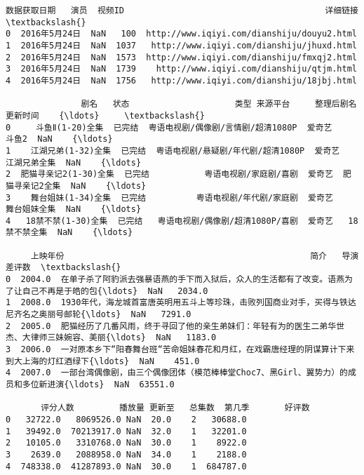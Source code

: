 \documentclass[11pt]{article}
\begin{document}
    \begin{Verbatim}[commandchars=\\\{\}]
       数据获取日期   演员  视频ID                                        详细链接  \textbackslash{}
0  2016年5月24日  NaN   100  http://www.iqiyi.com/dianshiju/douyu2.html   
1  2016年5月24日  NaN  1037   http://www.iqiyi.com/dianshiju/jhuxd.html   
2  2016年5月24日  NaN  1573  http://www.iqiyi.com/dianshiju/fmxqj2.html   
3  2016年5月24日  NaN  1739    http://www.iqiyi.com/dianshiju/qtjm.html   
4  2016年5月24日  NaN  1756   http://www.iqiyi.com/dianshiju/18jbj.html   

               剧名   状态                     类型 来源平台     整理后剧名 更新时间    {\ldots}     \textbackslash{}
0     斗鱼Ⅱ(1-20)全集  已完结  粤语电视剧/偶像剧/言情剧/超清1080P  爱奇艺       斗鱼2  NaN    {\ldots}      
1    江湖兄弟(1-32)全集  已完结  粤语电视剧/悬疑剧/年代剧/超清1080P  爱奇艺    江湖兄弟全集  NaN    {\ldots}      
2  肥猫寻亲记2(1-30)全集  已完结           粤语电视剧/家庭剧/喜剧  爱奇艺  肥猫寻亲记2全集  NaN    {\ldots}      
3    舞台姐妹(1-34)全集  已完结          粤语电视剧/年代剧/家庭剧  爱奇艺    舞台姐妹全集  NaN    {\ldots}      
4   18禁不禁(1-30)全集  已完结   粤语电视剧/偶像剧/超清1080P/喜剧  爱奇艺   18禁不禁全集  NaN    {\ldots}      

     上映年份                                                 简介   导演      差评数  \textbackslash{}
0  2004.0  在单子杀了阿豹派去强暴语燕的手下而入狱后，众人的生活都有了改变。语燕为了让自己不再是于皓的包{\ldots}  NaN   2034.0   
1  2008.0  1930年代，海龙城首富唐英明用五斗上等珍珠，击败列国商业对手，买得与铁达尼齐名之奥丽号邮轮{\ldots}  NaN   7291.0   
2  2005.0  肥猫经历了几番风雨，终于寻回了他的亲生弟妹们：年轻有为的医生二弟华世杰、大律师三妹婉容、美丽{\ldots}  NaN   1183.0   
3  2006.0  一对原本乡下“阳春舞台班“苦命姐妹春花和月红，在戏霸唐经理的阴谋算计下来到大上海的灯红酒绿下{\ldots}  NaN    451.0   
4  2007.0  一部台湾偶像剧，由三个偶像团体（模范棒棒堂Choc7、黑Girl、翼势力）的成员和多位新进演{\ldots}  NaN  63551.0   

       评分人数         播放量 更新至   总集数  第几季       好评数  
0   32722.0   8069526.0 NaN  20.0    2   30688.0  
1   39492.0  70213917.0 NaN  32.0    1   32201.0  
2   10105.0   3310768.0 NaN  30.0    1    8922.0  
3    2639.0   2088958.0 NaN  34.0    1    2188.0  
4  748338.0  41287893.0 NaN  30.0    1  684787.0  


\end{Verbatim}
\end{document}
